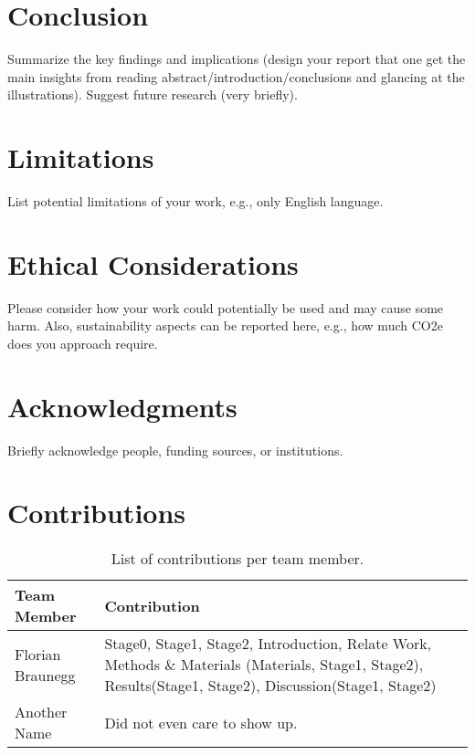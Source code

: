 \documentclass[12pt,a4paper,twocolumn]{article}
\begin{document}
\section{Conclusion}
\label{sec:conclusion}
Summarize the key findings and implications (design your report that one get the main insights from reading abstract/introduction/conclusions and glancing at the illustrations). 
Suggest future research (very briefly).


\newpage

\section*{Limitations}
List potential limitations of your work, e.g., only English language.

\section*{Ethical Considerations}
Please consider how your work could potentially be used and may cause some harm.
Also, sustainability aspects can be reported here, e.g., how much CO2e does you approach require.

\section*{Acknowledgments}
Briefly acknowledge people, funding sources, or institutions.

\section*{Contributions}
\begin{table}[h!]
    \centering
    \caption{List of contributions per team member.}
    \label{tab:contributions}
    \begin{tabular}{lp{4cm}}
        \toprule
        \textbf{Team Member} & \textbf{Contribution} \\
        \midrule
        Florian Braunegg           & Stage0, Stage1, Stage2, Introduction, Relate Work, Methods \& Materials (Materials, Stage1, Stage2), Results(Stage1, Stage2), Discussion(Stage1, Stage2)\\
        Another Name    & Did not even care to show up.    \\
        \bottomrule
    \end{tabular}
\end{table}
\end{document}
